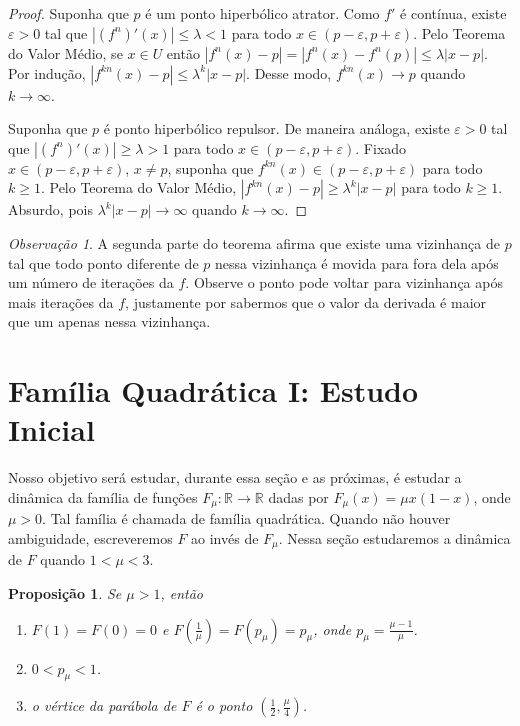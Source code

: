 \documentclass[a4paper, 12pt]{article}
\theoremstyle{definition}
\theoremstyle{plain}
\newtheorem{proposition}[definition]{Proposição}
\theoremstyle{plain}
\theoremstyle{plain}
\theoremstyle{remark}
\newtheorem*{remark}{Observação}
\newcommand{\RR}{\mathbb{R}}
\begin{document}
\begin{proof}
Suponha que $p$ é um ponto hiperbólico atrator. Como $f'$ é contínua, existe $\varepsilon > 0$ tal que $|(f^n)'(x)| \leq \lambda < 1$ para todo $x \in (p - \varepsilon, p + \varepsilon)$. Pelo Teorema do Valor Médio, se $x \in U$ então $|f^n(x) - p| = |f^n(x) - f^n(p)| \leq \lambda|x - p|$. Por indução, $|f^{kn}(x) - p| \leq \lambda^k|x - p|$. Desse modo, $f^{kn}(x) \longrightarrow p$ quando $k \longrightarrow \infty$.

Suponha que $p$ é ponto hiperbólico repulsor. De maneira análoga, existe $\varepsilon > 0$ tal que $|(f^n)'(x)| \geq \lambda > 1$ para todo $x \in (p- \varepsilon, p + \varepsilon)$. Fixado $x \in (p - \varepsilon, p + \varepsilon)$, $x \neq p$, suponha que $f^{kn}(x) \in (p - \varepsilon, p + \varepsilon)$ para todo $k \geq 1$. Pelo Teorema do Valor Médio, $|f^{kn}(x) - p| \geq \lambda^k|x - p|$ para todo $k \geq 1$. Absurdo, pois $\lambda^k|x - p| \longrightarrow \infty$ quando $k \longrightarrow \infty$.
\end{proof}

\begin{remark}
A segunda parte do teorema afirma que existe uma vizinhança de $p$ tal que todo ponto diferente de $p$ nessa vizinhança é movida para fora dela após um número de iterações da $f$. Observe o ponto pode voltar para vizinhança após mais iterações da $f$, justamente por sabermos que o valor da derivada é maior que um apenas nessa vizinhança.
\end{remark}

\section{Família Quadrática I: Estudo Inicial}

Nosso objetivo será estudar, durante essa seção e as próximas, é estudar a dinâmica da família de funções $F_{\mu}: \RR \rightarrow \RR$ dadas por $F_{\mu}(x) = \mu x(1-x)$, onde $\mu > 0$. Tal família é chamada de família quadrática. Quando não houver ambiguidade, escreveremos $F$ ao invés de $F_\mu$. Nessa seção estudaremos a dinâmica de $F$ quando $1 < \mu < 3$.

\begin{proposition}
Se $\mu > 1$, então
\begin{enumerate}
\item $F (1) = F(0) = 0$ e $F(\frac{1}{\mu}) = F(p_\mu) = p_\mu$, onde $p_\mu = \frac{\mu - 1}{\mu}$.
\item $0 < p_\mu < 1$.
\item o vértice da parábola de $F$ é o ponto $(\frac{1}{2}, \frac{\mu}{4})$.
\end{enumerate}
\end{proposition}
\end{document}
